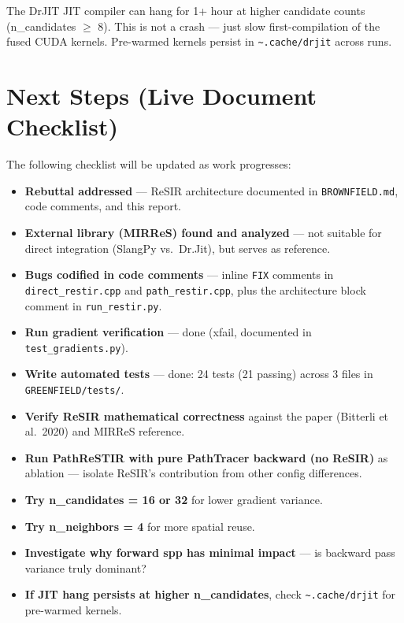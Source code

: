 The DrJIT JIT compiler can hang for 1+ hour at higher candidate counts
(n\_candidates $\ge$ 8). This is not a crash --- just slow
first-compilation of the fused CUDA kernels. Pre-warmed kernels persist in
\texttt{\textasciitilde{}.cache/drjit} across runs.

\section{Next Steps (Live Document Checklist)}
\label{sec:nextsteps}

The following checklist will be updated as work progresses:

\begin{itemize}
    \item[$\checkmark$] \textbf{Rebuttal addressed} --- ReSIR architecture
        documented in \texttt{BROWNFIELD.md}, code comments, and this report.
    \item[$\checkmark$] \textbf{External library (MIRReS) found and analyzed}
        --- not suitable for direct integration (SlangPy vs.\ Dr.Jit), but
        serves as reference.
    \item[$\checkmark$] \textbf{Bugs codified in code comments} --- inline
        \texttt{FIX} comments in \texttt{direct\_restir.cpp} and
        \texttt{path\_restir.cpp}, plus the architecture block comment in
        \texttt{run\_restir.py}.
    \item[$\checkmark$] \textbf{Run gradient verification} --- done (xfail,
        documented in \texttt{test\_gradients.py}).
    \item[$\checkmark$] \textbf{Write automated tests} --- done: 24 tests (21
        passing) across 3 files in \texttt{GREENFIELD/tests/}.
    \item[$\checkmark$] \textbf{Verify ReSIR mathematical correctness} against the
        paper (Bitterli et al.\ 2020) and MIRReS reference.
    \item[\,] \textbf{Run PathReSTIR with pure PathTracer backward (no
        ReSIR)} as ablation --- isolate ReSIR's contribution from other
        config differences.
    \item[\,] \textbf{Try n\_candidates = 16 or 32} for lower gradient
        variance.
    \item[\,] \textbf{Try n\_neighbors = 4} for more spatial reuse.
    \item[$\checkmark$] \textbf{Investigate why forward spp has minimal impact} --- is
        backward pass variance truly dominant?
    \item[\,] \textbf{If JIT hang persists at higher n\_candidates}, check
        \texttt{\textasciitilde{}.cache/drjit} for pre-warmed kernels.
\end{itemize}

